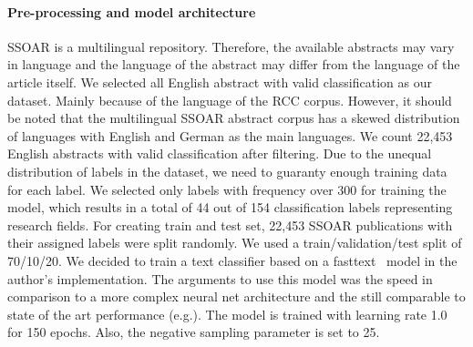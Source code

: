 \paragraph{Pre-processing and model architecture}
SSOAR is a multilingual repository.
Therefore, the available abstracts may vary in language and the language of the abstract may differ from the language of the article itself.
We selected all English abstract with valid classification as our dataset.
Mainly because of the language of the RCC corpus.
However, it should be noted that the multilingual SSOAR abstract corpus has a skewed distribution of languages with English and German as the main languages.
We count 22,453 English abstracts with valid classification after filtering.
Due to the unequal distribution of labels in the dataset, we need to guaranty enough training data for each label.
We selected only labels with frequency over 300 for training the model, which results in a total of 44 out of 154 classification labels representing research fields.
For creating train and test set, 22,453 SSOAR publications with their assigned labels were split randomly.
We used a train/validation/test split of 70/10/20.
We decided to train a text classifier based on a fasttext~\cite{joulin2017bag} model in the author's implementation.
The arguments to use this model was the speed in comparison to a more complex neural net architecture and the still comparable to state of the art performance (e.g.\cite{wang2018joint}).
The model is trained with learning rate 1.0 for 150 epochs.
Also, the negative sampling parameter is set to 25.


